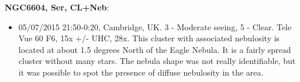 {\bf NGC6604, Ser, CL+Neb}:
\begin{itemize}
\item 05/07/2015 21:50-0:20, Cambridge, UK. 3 - Moderate seeing, 5 - Clear. Tele Vue 60 F6, 15x +/- UHC, 28x. This cluster with associated nebulosity is located at about 1.5 degrees North of the Eagle Nebula. It is a fairly spread cluster without many stars. The nebula shape was not really identifiable, but it was possible to spot the presence of diffuse nebulosity in the area. 
\end{itemize}

